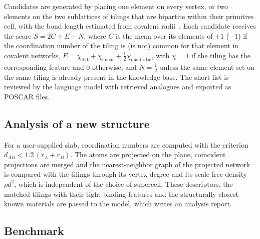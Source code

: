 \documentclass[prmaterials,twocolumn,superscriptaddress,longbibliography,nofootinbib]{revtex4-2}
\begin{document}
Candidates are generated by placing one element on every vertex, or two elements on the
two sublattices of tilings that are bipartite within their primitive cell, with the bond
length estimated from covalent radii~\cite{Cordero2008}. Each candidate receives the score
$S=2C+E+N$, where $C$ is the mean over its elements of $+1$ ($-1$) if the coordination
number of the tiling is (is not) common for that element in covalent networks,
$E=\chi_{\text{flat}}+\chi_{\text{linear}}+\tfrac12\chi_{\text{quadratic}}$, with
$\chi=1$ if the tiling has the corresponding feature and $0$ otherwise,
and $N=\tfrac12$ unless the same element set on the same tiling is already present in the
knowledge base. The short list is reviewed by the language model with retrieved analogues and
exported as POSCAR files.

\subsection{Analysis of a new structure}

For a user-supplied slab, coordination numbers are computed with the criterion
$d_{AB}<1.2\,(r_A+r_B)$. The atoms are projected on the plane, coincident projections are
merged and the nearest-neighbor graph of the projected network is compared with the tilings
through its vertex degree and its scale-free density $\rho d^2$, which is independent of the
choice of supercell. These descriptors, the matched tilings with their tight-binding
features and the structurally closest known materials are passed to the model, which writes
an analysis report.

\subsection{Benchmark}
\end{document}
